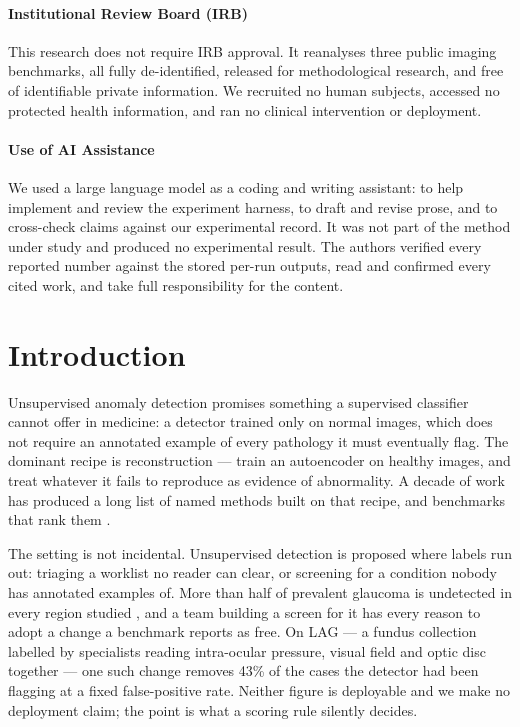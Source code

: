 \documentclass[pmlr,twocolumn,10pt]{jmlr} %
\begin{document}
\paragraph*{Institutional Review Board (IRB)}
This research does not require IRB approval. It reanalyses three public imaging benchmarks, all fully
de-identified, released for methodological research, and free of identifiable private
information. We recruited no human subjects, accessed no protected health information, and
ran no clinical intervention or deployment.

\paragraph*{Use of AI Assistance}
We used a large language model as a coding and writing assistant: to help implement and
review the experiment harness, to draft and revise prose, and to cross-check claims against
our experimental record. It was not part of the method under study and produced no
experimental result. The authors verified every reported number against the stored per-run
outputs, read and confirmed every cited work, and take full responsibility for the content.

\section{Introduction}
\label{sec:intro}
Unsupervised anomaly detection promises something a supervised classifier cannot offer in
medicine: a detector trained only on normal images, which does not require an annotated
example of every pathology it must eventually flag. The dominant recipe is reconstruction
--- train an autoencoder on healthy images, and treat whatever it fails to reproduce as
evidence of abnormality. A decade of work has produced a long list of named methods built on
that recipe, and benchmarks that rank them \citep{baur2021autoencoders,
lagogiannis2024unsupervised, cai2025medianomaly}.

The setting is not incidental. Unsupervised detection is proposed where labels run out:
triaging a worklist no reader can clear, or screening for a condition nobody has annotated
examples of. More than half of prevalent glaucoma is undetected in every region studied
\citep{soh2021undetected}, and a team building a screen for it has every reason to adopt a
change a benchmark reports as free. On LAG --- a fundus collection labelled by specialists
reading intra-ocular pressure, visual field and optic disc together --- one such change
removes 43\% of the cases the detector had been flagging at a fixed false-positive rate. Neither figure is
deployable and we make no deployment claim; the point is what a scoring rule silently
decides.
\end{document}
